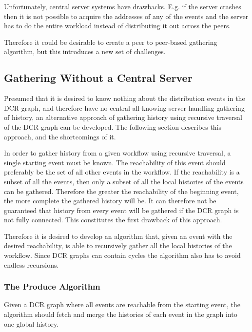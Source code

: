     \newpar Unfortunately, central server systems have drawbacks. E.g. if the server crashes then it is not possible to acquire the addresses of any of the events and the server has to do the entire workload instead of distributing it out across the peers.
    
    Therefore it could be desirable to create a peer to peer-based gathering algorithm, but this introduces a new set of challenges.
    
    \subsection{Gathering Without a Central Server}
	Presumed that it is desired to know nothing about the distribution events in the DCR graph, and therefore have no central all-knowing server handling gathering of history, an alternative approach of gathering history using recursive traversal of the DCR graph can be developed. The following section describes this approach, and the shortcomings of it. 
	
	\newpar In order to gather history from a given workflow using recursive traversal, a single starting event must be known. The reachability of this event should preferably be the set of all other events in the workflow. If the reachability is a subset of all the events, then only a subset of all the local histories of the events can be gathered. Therefore the greater the reachability of the beginning event, the more complete the gathered history will be. It can therefore not be guaranteed that history from every event will be gathered if the DCR graph is not fully connected. This constitutes the first drawback of this approach.
	
	Therefore it is desired to develop an algorithm that, given an event with the desired reachability, is able to recursively gather all the local histories of the workflow. Since DCR graphs can contain cycles the algorithm also has to avoid endless recursions.
	
	\subsubsection{The Produce Algorithm}
	Given a DCR graph where all events are reachable from the starting event, the algorithm should fetch and merge the histories of each event in the graph into one global history.
	
